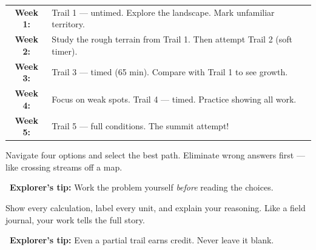 {\begin{tcolorbox}
    \medskip
    \renewcommand{\arraystretch}{1.4}
    \begin{tabular}{@{}cl@{}}
        \textcolor{funTealDark}{\bfseries Week 1:} & Trail 1 --- untimed. Explore the landscape. Mark unfamiliar territory. \\
        \textcolor{funTealDark}{\bfseries Week 2:} & Study the rough terrain from Trail 1. Then attempt Trail 2 (soft timer). \\
        \textcolor{funTealDark}{\bfseries Week 3:} & Trail 3 --- timed (65 min). Compare with Trail 1 to see growth. \\
        \textcolor{funTealDark}{\bfseries Week 4:} & Focus on weak spots. Trail 4 --- timed. Practice showing all work. \\
        \textcolor{funTealDark}{\bfseries Week 5:} & Trail 5 --- full conditions. The summit attempt! \\
    \end{tabular}
\end{tcolorbox}

\vspace{2mm}

\noindent
\begin{minipage}[t]{0.48\textwidth}
\begin{tcolorbox}[
    enhanced,
    colback=funTeal!6,
    colframe=funTeal!40,
    arc=8pt, boxrule=1pt,
    left=4mm, right=4mm, top=3mm, bottom=3mm,
    title={\textcolor{white}{\faCircle~Multiple Choice}},
    colbacktitle=funTeal!65,
    fonttitle=\bfseries\sffamily,
    height=5.2cm,
    valign=center,
]
    \small Navigate four options and select the best path.
    Eliminate wrong answers first --- like crossing
    streams off a map.

    \medskip
    \textcolor{funTeal}{\faLightbulb}~\textbf{Explorer's tip:} Work the problem
    yourself \textit{before} reading the choices.
\end{tcolorbox}
\end{minipage}%
\hfill
\begin{minipage}[t]{0.48\textwidth}
\begin{tcolorbox}[
    enhanced,
    colback=funOrange!8,
    colframe=funOrange!45,
    arc=8pt, boxrule=1pt,
    left=4mm, right=4mm, top=3mm, bottom=3mm,
    title={\textcolor{white}{\faPen~Constructed Response}},
    colbacktitle=funOrange!70,
    fonttitle=\bfseries\sffamily,
    height=5.2cm,
    valign=center,
]
    \small Show every calculation, label every unit,
    and explain your reasoning. Like a field journal,
    your work tells the full story.

    \medskip
    \textcolor{funOrange}{\faLightbulb}~\textbf{Explorer's tip:} Even a partial
    trail earns credit. Never leave it blank.
\end{tcolorbox}
\end{minipage}

}

\newpage
